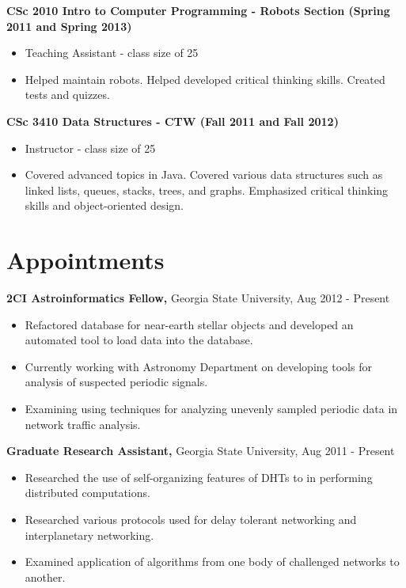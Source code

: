 \documentclass{res}
\begin{document}
\begin{resume}
{\bf CSc 2010 Intro to Computer Programming - Robots Section (Spring 2011 and Spring 2013) }
    \begin{itemize}
      \item Teaching Assistant - class size of 25
      \item Helped maintain robots.  Helped developed critical thinking skills.  Created tests and quizzes.
    \end{itemize}


{\bf CSc 3410 Data Structures  - CTW (Fall 2011 and  Fall 2012) }
    \begin{itemize}
    \item Instructor - class size of 25
      \item Covered advanced topics in Java.  Covered various data structures such as linked lists, queues, stacks, trees, and graphs.  Emphasized critical thinking skills and object-oriented design.
    \end{itemize}





\section{Appointments}

{\bf 2CI Astroinformatics Fellow,} Georgia State University, Aug 2012 - Present
     \begin{itemize}
     \item Refactored database for near-earth stellar objects and developed an automated tool to load data into the database.
     \item Currently working with Astronomy Department on developing tools for analysis of suspected periodic signals.
     \item Examining using techniques for analyzing unevenly sampled periodic data in network traffic analysis.
     \end{itemize}   


{\bf Graduate Research Assistant,} Georgia State University, Aug 2011 - Present
     \begin{itemize}
     \item Researched the use of self-organizing features of DHTs to in performing distributed computations.
     \item Researched various protocols used for delay tolerant networking and interplanetary networking.
     \item Examined application of algorithms from one body of challenged networks to another.
  

\end{itemize}
\end{resume}
\end{document}
